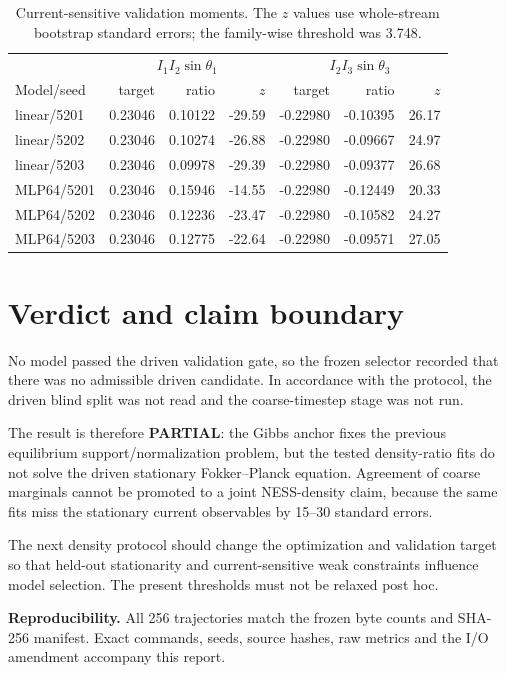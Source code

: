 \documentclass[11pt]{article}
\begin{document}
\begin{table}[ht]
\centering
\small
\caption{Current-sensitive validation moments.  The $z$ values use whole-stream
bootstrap standard errors; the family-wise threshold was 3.748.}
\label{tab:currents}
\begin{tabular}{lrrr@{\qquad}rrr}
\toprule
& \multicolumn{3}{c}{$I_1I_2\sin\theta_1$}
& \multicolumn{3}{c}{$I_2I_3\sin\theta_3$}\\
Model/seed & target & ratio & $z$ & target & ratio & $z$\\
\midrule
linear/5201 & 0.23046 & 0.10122 & -29.59 & -0.22980 & -0.10395 & 26.17\\
linear/5202 & 0.23046 & 0.10274 & -26.88 & -0.22980 & -0.09667 & 24.97\\
linear/5203 & 0.23046 & 0.09978 & -29.39 & -0.22980 & -0.09377 & 26.68\\
MLP64/5201 & 0.23046 & 0.15946 & -14.55 & -0.22980 & -0.12449 & 20.33\\
MLP64/5202 & 0.23046 & 0.12236 & -23.47 & -0.22980 & -0.10582 & 24.27\\
MLP64/5203 & 0.23046 & 0.12775 & -22.64 & -0.22980 & -0.09571 & 27.05\\
\bottomrule
\end{tabular}
\end{table}

\section{Verdict and claim boundary}
No model passed the driven validation gate, so the frozen selector recorded
that there was no admissible driven candidate.  In accordance with the protocol,
the driven blind split was not read and the coarse-timestep stage was not run.

The result is therefore \textbf{PARTIAL}: the Gibbs anchor fixes the previous
equilibrium support/normalization problem, but the tested density-ratio fits do
not solve the driven stationary Fokker--Planck equation.  Agreement of coarse
marginals cannot be promoted to a joint NESS-density claim, because the same
fits miss the stationary current observables by 15--30 standard errors.

The next density protocol should change the optimization and validation target
so that held-out stationarity and current-sensitive weak constraints influence
model selection.  The present thresholds must not be relaxed post hoc.

\smallskip
\noindent\textbf{Reproducibility.}
All 256 trajectories match the frozen byte counts and SHA-256 manifest.  Exact
commands, seeds, source hashes, raw metrics and the I/O amendment accompany
this report.
\end{document}
